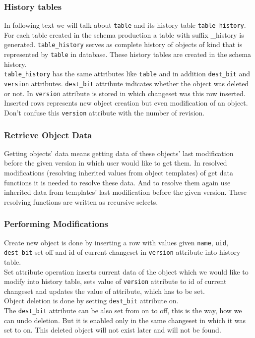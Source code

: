 \documentclass[deska]{subfiles}
\begin{document}
\subsubsection{History tables}
In following text we will talk about {\tt table} and its history table {\tt table\_history}.\\
For each table created in the schema production a table with suffix \_history is generated. {\tt table\_history} serves as complete history of objects of kind that is represented by {\tt table} in database. These history tables are created in the schema history.\\
{\tt table\_history} has the same attributes like {\tt table} and in addition {\tt dest\_bit} and {\tt version} attributes. {\tt dest\_bit} attribute indicates whether the object was deleted or not. In {\tt version} attribute is stored in which changeset was this row inserted. Inserted rows represents new object creation but even modification of an object. Don't confuse this {\tt version} attribute with the number of revision.

\subsubsection{Retrieve Object Data}
Getting objects' data means getting data of these objects' last modification before the given version in which user would like to get them.
In resolved modifications (resolving inherited values from object templates) of get data functions it is needed to resolve these data. And to resolve them again use inherited data from templates' last modification before the given version.
These resolving functions are written as recursive selects.

\subsubsection{Performing Modifications}
Create new object is done by inserting a row with values given {\tt name}, {\tt uid}, {\tt dest\_bit} set off and id of current changeset in {\tt version} attribute into history table.\\
Set attribute operation inserts current data of the object which we would like to modify into history table, sets value of {\tt version} attribute to id of current changeset and updates the value of attribute, which has to be set.\\
Object deletion is done by setting {\tt dest\_bit} attribute on.\\
The {\tt dest\_bit} attribute can be also set from on to off, this is the way, how we can undo deletion. But it is enabled only in the same changeset in which it was set to on. This deleted object will not exist later and will not be found.
\end{document}
